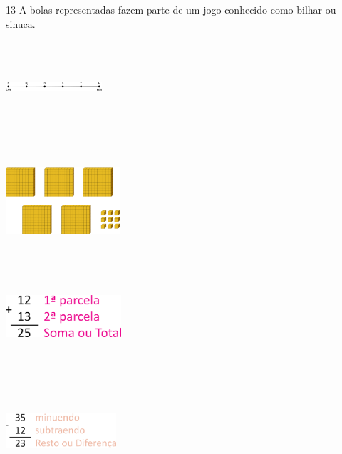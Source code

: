 \num{13} A bolas representadas fazem parte de um jogo conhecido como
bilhar ou sinuca.

\includegraphics[width=1.40833in,height=1.33406in]{media/image8.png}


\includegraphics[width=1.66667in,height=1.61877in]{media/image9.png}


\includegraphics[width=1.68333in,height=1.36449in]{media/image10.png}


\includegraphics[width=1.61667in,height=1.60236in]{media/image11.png}

